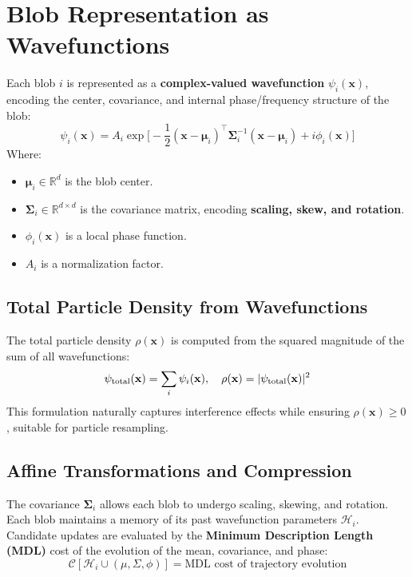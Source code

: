 \documentclass[11pt]{article}
\begin{document}
\section{Blob Representation as Wavefunctions}
Each blob $i$ is represented as a \textbf{complex-valued wavefunction} $\psi_i(\mathbf{x})$, encoding the center, covariance, and internal phase/frequency structure of the blob:
\[
\psi_i(\mathbf{x}) = A_i \exp\Big[-\frac{1}{2} (\mathbf{x}-\mathbf{\mu}_i)^\top \mathbf{\Sigma}_i^{-1} (\mathbf{x}-\mathbf{\mu}_i) + i \phi_i(\mathbf{x}) \Big]
\]
Where:
\begin{itemize}
    \item $\mathbf{\mu}_i \in \mathbb{R}^d$ is the blob center.
    \item $\mathbf{\Sigma}_i \in \mathbb{R}^{d \times d}$ is the covariance matrix, encoding \textbf{scaling, skew, and rotation}.
    \item $\phi_i(\mathbf{x})$ is a local phase function.
    \item $A_i$ is a normalization factor.
\end{itemize}

\subsection{Total Particle Density from Wavefunctions}
The total particle density $\rho(\mathbf{x})$ is computed from the squared magnitude of the sum of all wavefunctions:
\[
\psi_{\rm total}(\mathbf{x}) = \sum_i \psi_i(\mathbf{x}), \quad \rho(\mathbf{x}) = |\psi_{\rm total}(\mathbf{x})|^2
\]
This formulation naturally captures interference effects while ensuring $\rho(\mathbf{x}) \ge 0$, suitable for particle resampling.

\subsection{Affine Transformations and Compression}
The covariance $\mathbf{\Sigma}_i$ allows each blob to undergo scaling, skewing, and rotation. Each blob maintains a memory of its past wavefunction parameters $\mathcal{H}_i$. Candidate updates are evaluated by the \textbf{Minimum Description Length (MDL)} cost of the evolution of the mean, covariance, and phase:
\[
\mathcal{C}[\mathcal{H}_i \cup (\mu, \Sigma, \phi)] = \text{MDL cost of trajectory evolution}
\]
\end{document}
